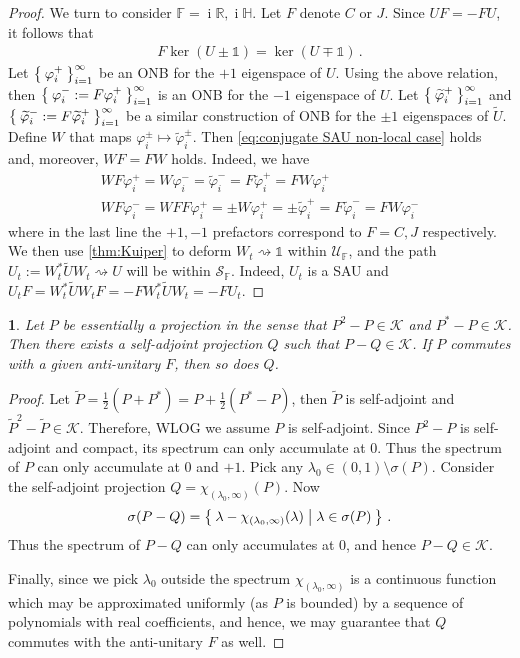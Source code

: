 \documentclass[a4paper,10pt]{article}
\numberwithin{equation}{section}
\theoremstyle{plain}
\theoremstyle{plain}
\newtheorem{lem}[thm]{\protect\lemmaname}
\theoremstyle{plain}
\theoremstyle{plain}
\theoremstyle{plain}
\theoremstyle{remark}
\theoremstyle{definition}
\theoremstyle{plain}
\providecommand{\lemmaname}{Lemma}
\newcommand{\ii}{\operatorname{i}}
\newcommand{\RR}{\mathbb{R}}
\newcommand{\FF}{\mathbb{F}}
\newcommand{\calU}{\mathcal{U}}
\newcommand{\calK}{\mathcal{K}}
\newcommand{\calS}{\mathcal{S}}
\newcommand{\ti}[1]{\widetilde{#1}}
\newcommand{\vf}{\varphi}
\newcommand{\Id}{\mathds{1}}
\newcommand{\HH}{\mathbb{H}}
\newcommand{\eq}[1]{\begin{align*}#1\end{align*}}
\begin{document}
\begin{proof}
			We turn to consider $\FF=\ii\RR,\ii\HH$. Let $F$ denote $C$ or $J$. Since $UF=-FU$, it follows that \eq{F \ker (U\pm \Id)=\ker (U\mp \Id)\,.} 
			Let $\Set{\vf_i^+}_{i=1}^\infty$ be an ONB for the $+1$ eigenspace of $U$. Using the above relation, then $\Set{\vf_i^-:=F\vf_i^+}_{i=1}^\infty$ is an ONB for the $-1$ eigenspace of $U$. Let $\Set{\ti{\vf}_i^+}_{i=1}^\infty$ and $\Set{\ti{\vf}_i^-:=F\ti{\vf}_i^+}_{i=1}^\infty$ be a similar construction of ONB for the $\pm 1$ eigenspaces of $\ti{U}$. Define $W$ that maps $\vf_i^\pm \mapsto \ti{\vf}_i^\pm$. Then \cref{eq:conjugate SAU non-local case} holds and, moreover, $WF=FW$ holds. Indeed, we have \eq{W F \vf_i^+=W  \vf_i^-=\ti{\vf}_i^- =F\ti{\vf}_i^+=FW\vf_i^+ \\ W F \vf_i^-=WFF\vf_i^+=\pm W\vf_i^+=\pm \ti{\vf}_i^+=F\ti{\vf}_i^-=FW\vf_i^- } where in the last line the $+1,-1$ prefactors correspond to $F=C,J$ respectively. 
			We then use \cref{thm:Kuiper} to deform $W_t\rightsquigarrow \Id$ within $\calU_\FF$, and the path $U_t:=W_t^*\ti{U} W_t\rightsquigarrow U$ will be within $\calS_\FF$. Indeed, $U_t$ is a SAU and $U_tF=W_t^*\ti{U} W_t F=-FW_t^*\ti{U} W_t=-FU_t$.
			
		\end{proof}
		
		\begin{lem}\label{lem:essential projection is compact away from genuine projection}
			Let $P$ be essentially a projection in the sense that $P^2-P\in\calK$ and $P^*-P\in\calK$. Then there exists a self-adjoint projection $Q$ such that $P-Q\in\calK$. If $P$ commutes with a given anti-unitary $F$, then so does $Q$.
		\end{lem}
		\begin{proof}
			Let $\widetilde{P}=\frac{1}{2}(P+P^*)=P+\frac{1}{2}(P^*-P)$, then $\widetilde{P}$ is self-adjoint and $\widetilde{P}^2-\widetilde{P}\in\calK$. Therefore, WLOG we assume $P$ is self-adjoint. Since $P^2-P$ is self-adjoint and compact, its spectrum can only accumulate at $0$. Thus the spectrum of $P$ can only accumulate at $0$ and $+1$. Pick any $\lambda_0\in (0,1)\setminus \sigma(P)$. Consider the self-adjoint projection $Q=\chi_{(\lambda_0,\infty)}(P)$. Now \eq{\sigma(P-Q)=\Set{\lambda-\chi_{(\lambda_0,\infty)}(\lambda) | \lambda\in\sigma(P)}\,.} 
			Thus the spectrum of $P-Q$ can only accumulates at $0$, and hence $P-Q\in\calK$.
			
			Finally, since we pick $\lambda_0$ outside the spectrum $\chi_{(\lambda_0,\infty)}$ is a continuous function which may be approximated uniformly (as $P$ is bounded) by a sequence of polynomials with real coefficients, and hence, we may guarantee that $Q$ commutes with the anti-unitary $F$ as well. 
		\end{proof}
		
\end{document}

